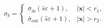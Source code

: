 $$
\sigma_b = \begin{cases}
\bar\sigma_{\mathrm{in}} \left(\hat s \varepsilon + 1\right), & \lvert\mathbf x\rvert<r_1,\\
\bar\sigma_{\mathrm{out}} \left(\hat s \varepsilon + 1\right), & \lvert\mathbf x\rvert>r_2.
\end{cases}
$$

